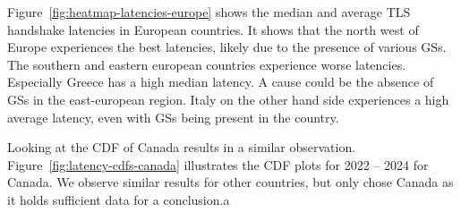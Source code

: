 Figure~\ref{fig:heatmap-latencies-europe} shows the median and average TLS
handshake latencies in European countries. It shows that the north west of
Europe experiences the best latencies, likely due to the presence of various
\ac{GS}s. The southern and eastern european countries experience worse
latencies. Especially Greece has a high median latency. A cause could be the
absence of \ac{GS}s in the east-european region. Italy on the other hand side
experiences a high average latency, even with \ac{GS}s being present in the
country.

Looking at the CDF of Canada results in a similar observation.
Figure~\ref{fig:latency-cdfs-canada} illustrates the CDF plots for 2022 -- 2024
for Canada. We observe similar results for other countries, but only chose
Canada as it holds sufficient data for a conclusion.a


